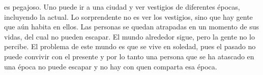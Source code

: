 \documentclass[12pt,a4paper]{report}
\begin{document}
\begin{itemize}
{\begin{itemize}[label=$\bullet$]
{            es pegajoso. Uno puede ir a una ciudad y ver vestigios de diferentes
            épocas, incluyendo la actual. Lo sorprendente no es ver los
            vestigios, sino que hay gente que aún habita en ellos. Las personas
            se quedan atrapadas en un momento de sus vidas, del cual no pueden
            escapar. El mundo alrededor sigue, pero la gente no lo percibe. El
            problema de este mundo es que se vive en soledad, pues el pasado no
            puede convivir con el presente y por lo tanto una persona que se ha
            atascado en una época no puede escapar y no hay con quen comparta
            esa época.
        }
    \end{itemize}
}
\end{itemize}
\end{document}
